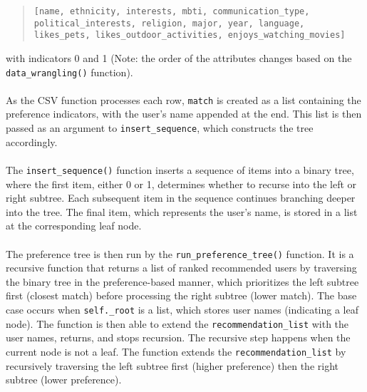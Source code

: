 \documentclass[fontsize=11pt]{article}
\begin{document}
\begin{quote}
\texttt{[name, ethnicity, interests, mbti, communication\_type,} \\
\texttt{political\_interests, religion, major, year, language,} \\
\texttt{likes\_pets, likes\_outdoor\_activities, enjoys\_watching\_movies]}
\end{quote}
with indicators 0 and 1 (Note: the order of the attributes changes based on the \texttt{data\_wrangling()} function).  
\\
\\
As the CSV function processes each row, \texttt{match} is created as a list containing the preference indicators, with the user's name appended at the end. This list is then passed as an argument to \texttt{insert\_sequence}, which constructs the tree accordingly. 
\\
\\
The \texttt{insert\_sequence()} function inserts a sequence of items into a binary tree, where the first item, either 0 or 1, determines whether to recurse into the left or right subtree. 
Each subsequent item in the sequence continues branching deeper into the tree. The final item, which represents the user’s name, is stored in a list at the corresponding leaf node.
\\
\\
The preference tree is then run by the \texttt{run\_preference\_tree()} function. It is a recursive function that returns a list of ranked recommended users by traversing the binary tree in the preference-based manner, 
which prioritizes the left subtree first (closest match) before processing the right subtree (lower match). The base case occurs when \texttt{self.\_root} is a list, 
which stores user names (indicating a leaf node). The function is then able to extend the \texttt{recommendation\_list} with the user names, returns, and stops recursion. 
The recursive step happens when the current node is not a leaf. The function extends the \texttt{recommendation\_list} by recursively traversing the left subtree first (higher preference) then 
the right subtree (lower preference).
\\
\\
\end{document}
